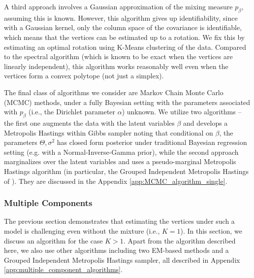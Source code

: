 \documentclass[bj,authoryear]{imsart}
\theoremstyle{plain}
\theoremstyle{remark}
\begin{document}
A third approach involves a Gaussian approximation of the mixing measure $p_{\beta}$, assuming this is known. However, this algorithm gives up identifiability, since with a Gaussian kernel, only the column space of the covariance is identifiable, which means that the vertices can be estimated up to a rotation. We fix this by estimating an optimal rotation using K-Means clustering of the data. Compared to the spectral algorithm (which is known to be exact when the vertices are linearly independent), this algorithm works reasonably well even when the vertices form a convex polytope (not just a simplex).

The final class of algorithms we consider are Markov Chain Monte Carlo (MCMC) methods, under a fully Bayesian setting with the parameters associated with $p_{\beta}$ (i.e., the Dirichlet parameter $\alpha$) unknown. We utilize two algorithms -- the first one augments the data with the latent variables $\beta$ and develops a Metropolis Hastings within Gibbs sampler noting that conditional on $\beta$, the parameters $\Theta,\sigma^2$ has closed form posterior under traditional Bayesian regression setting (e.g. with a Normal-Inverse-Gamma prior), while the second approach marginalizes over the latent variables and uses a pseudo-marginal Metropolis Hastings \citep{andrieu2009pseudo} algorithm (in particular, the Grouped Independent Metropolis Hastings of \cite{beaumont2003estimation}). They are discussed in the Appendix \ref{app:MCMC_algorithm_single}.

\subsubsection{Multiple Components}
\label{subsec:multiple_components}
The previous section demonstrates that estimating the vertices under such a model is challenging even without the mixture (i.e., $K=1$). In this section, we discuss an algorithm for the case $K>1$. Apart from the algorithm described here, we also use other algorithms including two EM-based methods and a Grouped Independent Metropolis Hastings sampler, all described in Appendix \ref{app:multiple_component_algorithms}.
\end{document}

